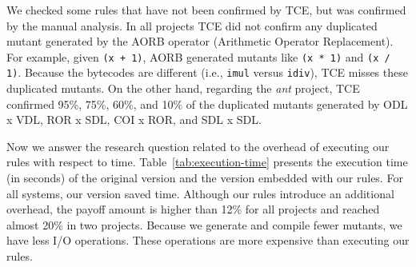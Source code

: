We checked some rules that have not been confirmed by TCE, but was confirmed by the manual analysis.
In all projects TCE did not confirm any duplicated mutant generated by the AORB operator (Arithmetic Operator Replacement). 
For example, given \texttt{(x + 1)}, AORB generated mutants like \texttt{(x * 1)} and \texttt{(x / 1)}. 
Because the bytecodes are different (i.e., \texttt{imul} versus \texttt{idiv}), TCE misses these duplicated mutants. 
On the other hand, regarding the \textit{ant} project, TCE confirmed 95\%, 75\%, 60\%, and 10\% of the duplicated mutants generated by ODL x VDL, ROR x SDL, COI x ROR, and SDL x SDL.

Now we answer the research question related to the overhead of executing our rules with respect to time. 
Table~\ref{tab:execution-time} presents the execution time (in seconds) of the original \mujava{} version and the version embedded with our rules. 
For all systems, our version saved time. 
Although our rules introduce an additional overhead, the payoff amount is higher than 12\% for all projects and reached almost 20\% in two projects. 
Because we generate and compile fewer mutants, we have less I/O operations. 
These operations are more expensive than executing our rules.

